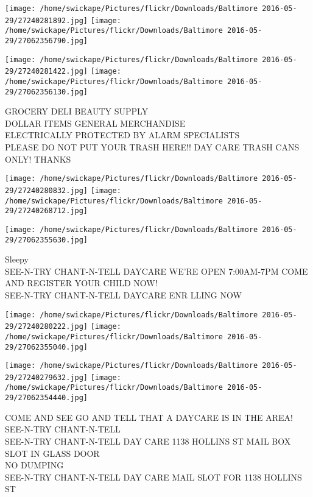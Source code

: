 \documentclass[10pt,letterpaper]{article}
\begin{document}
\texttt{[image: /home/swickape/Pictures/flickr/Downloads/Baltimore 2016-05-29/27240281892.jpg]}
\texttt{[image: /home/swickape/Pictures/flickr/Downloads/Baltimore 2016-05-29/27062356790.jpg]}

\texttt{[image: /home/swickape/Pictures/flickr/Downloads/Baltimore 2016-05-29/27240281422.jpg]}
\texttt{[image: /home/swickape/Pictures/flickr/Downloads/Baltimore 2016-05-29/27062356130.jpg]}

GROCERY DELI BEAUTY SUPPLY\\
DOLLAR ITEMS GENERAL MERCHANDISE\\
ELECTRICALLY PROTECTED BY ALARM SPECIALISTS\\
PLEASE DO NOT PUT YOUR TRASH HERE!! DAY CARE TRASH CANS ONLY!  THANKS
\pagebreak

\texttt{[image: /home/swickape/Pictures/flickr/Downloads/Baltimore 2016-05-29/27240280832.jpg]}
\texttt{[image: /home/swickape/Pictures/flickr/Downloads/Baltimore 2016-05-29/27240268712.jpg]}

\vspace{0.25in}
\texttt{[image: /home/swickape/Pictures/flickr/Downloads/Baltimore 2016-05-29/27062355630.jpg]}

Sleepy\\
SEE{-}N{-}TRY CHANT{-}N{-}TELL DAYCARE WE'RE OPEN 7:00AM{-}7PM COME AND REGISTER YOUR CHILD NOW!\\
SEE{-}N{-}TRY CHANT{-}N{-}TELL DAYCARE ENR LLING NOW
\pagebreak

\texttt{[image: /home/swickape/Pictures/flickr/Downloads/Baltimore 2016-05-29/27240280222.jpg]}
\texttt{[image: /home/swickape/Pictures/flickr/Downloads/Baltimore 2016-05-29/27062355040.jpg]}

\texttt{[image: /home/swickape/Pictures/flickr/Downloads/Baltimore 2016-05-29/27240279632.jpg]}
\texttt{[image: /home/swickape/Pictures/flickr/Downloads/Baltimore 2016-05-29/27062354440.jpg]}

COME AND SEE GO AND TELL THAT A DAYCARE IS IN THE AREA!  SEE{-}N{-}TRY CHANT{-}N{-}TELL\\
SEE{-}N{-}TRY CHANT{-}N{-}TELL DAY CARE 1138 HOLLINS ST MAIL BOX SLOT IN GLASS DOOR\\
NO DUMPING\\
SEE{-}N{-}TRY CHANT{-}N{-}TELL DAY CARE MAIL SLOT FOR 1138 HOLLINS ST
\pagebreak
\end{document}
